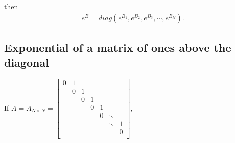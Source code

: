 \documentclass[letterpaper,10pt,english]{jupyterBook}
\begin{document}
\sphinxAtStartPar
then
\begin{equation*}
\begin{split}
e^B = diag(e^{B_1}, e^{B_2}, e^{B_3}, \dotsm, e^{B_N}).
\end{split}
\end{equation*}

\subsection{Exponential of a matrix of ones above the diagonal}
\label{\detokenize{appendix:exponential-of-a-matrix-of-ones-above-the-diagonal}}
\sphinxAtStartPar
If \(A = A_{N \times N} =   
\left[ {\begin{array}{ccccccc}
    0 & 1 &  &  &  &  & \\
     & 0 & 1 &  &  &  &\\
     &  & 0 & 1 &  &  &\\
     &  &  & 0 & 1 &  &\\
     &  &  &  & 0 & \ddots &  \\
     &  &  &  &  & \ddots & 1 \\
     &  &  &  &  &  & 0 \\
\end{array} } \right] \),
\end{document}
